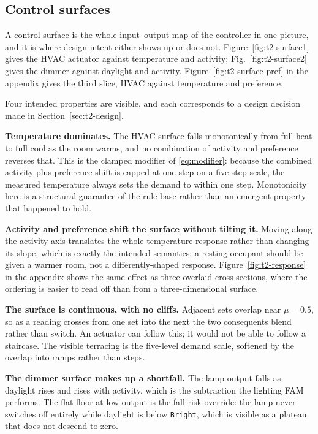 \subsection{Control surfaces}

A control surface is the whole input--output map of the controller in one
picture, and it is where design intent either shows up or does not.
Figure~\ref{fig:t2-surface1} gives the HVAC actuator against temperature and
activity; Fig.~\ref{fig:t2-surface2} gives the dimmer against daylight and
activity. Figure~\ref{fig:t2-surface-pref} in the appendix gives the third
slice, HVAC against temperature and preference.

Four intended properties are visible, and each corresponds to a design decision
made in Section~\ref{sec:t2-design}.

\textbf{Temperature dominates.} The HVAC surface falls monotonically from full
heat to full cool as the room warms, and no combination of activity and
preference reverses that. This is the clamped modifier of \eqref{eq:modifier}:
because the combined activity-plus-preference shift is capped at one step on a
five-step scale, the measured temperature always sets the demand to within one
step. Monotonicity here is a structural guarantee of the rule base rather than
an emergent property that happened to hold.

\textbf{Activity and preference shift the surface without tilting it.} Moving
along the activity axis translates the whole temperature response rather than
changing its slope, which is exactly the intended semantics: a resting occupant
should be given a warmer room, not a differently-shaped response.
Figure~\ref{fig:t2-response} in the appendix shows the same effect as three
overlaid cross-sections, where the ordering is easier to read off than from a
three-dimensional surface.

\textbf{The surface is continuous, with no cliffs.} Adjacent sets overlap near
$\mu = 0.5$, so as a reading crosses from one set into the next the two
consequents blend rather than switch. An actuator can follow this; it would not
be able to follow a staircase. The visible terracing is the five-level demand
scale, softened by the overlap into ramps rather than steps.

\textbf{The dimmer surface makes up a shortfall.} The lamp output falls as
daylight rises and rises with activity, which is the subtraction the lighting
FAM performs. The flat floor at low output is the fall-risk override: the lamp
never switches off entirely while daylight is below \texttt{Bright}, which is
visible as a plateau that does not descend to zero.

